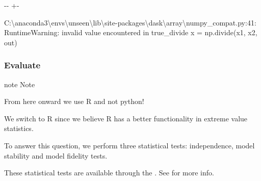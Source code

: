 \documentclass[letterpaper,10pt,english]{sphinxmanual}
\newlength\nbsphinxcodecellspacing
\begin{document}
{

\kern-\sphinxverbatimsmallskipamount\kern-\baselineskip
\kern+\FrameHeightAdjust\kern-\fboxrule
\vspace{\nbsphinxcodecellspacing}

\begin{sphinxVerbatim}[commandchars=\\\{\}]
C:\textbackslash{}anaconda3\textbackslash{}envs\textbackslash{}unseen\textbackslash{}lib\textbackslash{}site-packages\textbackslash{}dask\textbackslash{}array\textbackslash{}numpy\_compat.py:41: RuntimeWarning: invalid value encountered in true\_divide
  x = np.divide(x1, x2, out)
\end{sphinxVerbatim}
}


\subsubsection{Evaluate}
\label{\detokenize{Notebooks/examples/California_Fires:Evaluate}}
\begin{sphinxadmonition}{note}{}\unskip
Note

From here onward we use R and not python!

We switch to R since we believe R has a better functionality in extreme value statistics.
\end{sphinxadmonition}


\begin{DUlineblock}{0em}
\item[] To answer this question, we perform three statistical tests: independence, model stability and model fidelity tests.
\item[] These statistical tests are available through the . See {\hyperref[\detokenize{Notebooks/3.Evaluate/3.Evaluate::doc}]{}} for more info.
\end{DUlineblock}

{
\begin{sphinxVerbatim}[commandchars=\\\{\}]
\llap{\color{nbsphinxin}[2]:\,\hspace{\fboxrule}\hspace{\fboxsep}}
\end{sphinxVerbatim}
}
\end{document}
